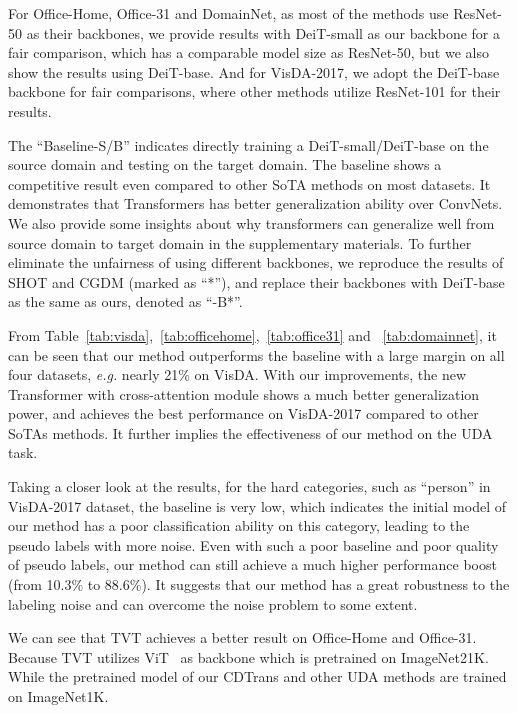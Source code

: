 \documentclass[dvipsnames, svgnames, x11names, table]{article} \usepackage{iclr2022_conference,times}
\begin{document}
\begin{spacing}{1.0}
For Office-Home, Office-31 and DomainNet, as most of the methods use ResNet-50 as their backbones,  we provide results with DeiT-small as our backbone for a fair comparison, which has a comparable model size as ResNet-50, but we also show the results using DeiT-base. And for VisDA-2017, we adopt the DeiT-base backbone for fair comparisons, where other methods utilize ResNet-101 for their results.

The ``Baseline-S/B'' indicates directly training a DeiT-small/DeiT-base on the source domain and testing on the target domain.
The baseline shows a competitive result even compared to other SoTA methods on most datasets.
It demonstrates that Transformers has better generalization ability over ConvNets. We also provide some insights about why transformers can generalize well from source domain to target domain in the supplementary materials.
To further eliminate the unfairness of using different backbones, we reproduce the results of SHOT and CGDM (marked as ``*''), and replace their backbones with DeiT-base as the same as ours, denoted as ``-B*''.

From Table~\ref{tab:visda},~\ref{tab:officehome},~\ref{tab:office31} and ~\ref{tab:domainnet}, it can be seen that our method outperforms the baseline with a large margin on all four datasets, \textit{e.g.} nearly 21\% on VisDA. 
With our improvements, the new Transformer with cross-attention module shows a much better generalization power, and achieves the best performance on VisDA-2017 compared to other SoTAs methods. It further implies the effectiveness of our method on the UDA task. 


Taking a closer look at the results, for the hard categories, such as ``person'' in VisDA-2017 dataset, the baseline is very low, which indicates the initial model of our method has a poor classification ability on this category, leading to the pseudo labels with  more noise. Even with such a poor baseline and poor quality of pseudo labels, our method can still achieve a much higher performance boost (from 10.3\% to 88.6\%). It suggests that our method has a great robustness to the labeling noise and can overcome the noise problem to some extent. 



We can see that TVT achieves a better result on Office-Home and Office-31. Because TVT utilizes ViT~\citep{dosovitskiy2020image} as backbone which is pretrained on ImageNet21K. While the pretrained model of our CDTrans and other UDA methods are trained on ImageNet1K.




\end{spacing}
\end{document}
